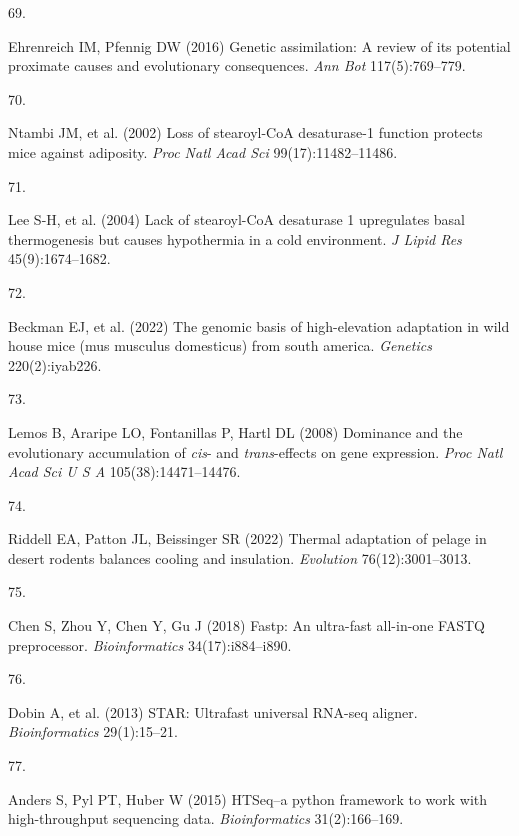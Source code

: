 \documentclass[9pt,twocolumn,twoside,lineno]{pnas-new}
\newlength{\cslhangindent}
\newlength{\csllabelwidth}
\newlength{\cslentryspacingunit} %
\newenvironment{CSLReferences}[2] %
 {%
  \setlength{\parindent}{0pt}
  \ifodd #1
  \let\oldpar\par
  \def\par{\hangindent=\cslhangindent\oldpar}
  \fi
  \setlength{\parskip}{#2\cslentryspacingunit}
 }%
 {}
\newcommand{\CSLLeftMargin}[1]{\parbox[t]{\csllabelwidth}{#1}}
\newcommand{\CSLRightInline}[1]{\parbox[t]{\linewidth - \csllabelwidth}{#1}\break}
\begin{document}
\begin{CSLReferences}{0}{0}
\leavevmode{}%
\CSLLeftMargin{69. }%
\CSLRightInline{Ehrenreich IM, Pfennig DW (2016) Genetic assimilation: A
review of its potential proximate causes and evolutionary consequences.
\emph{Ann Bot} 117(5):769--779.}

\leavevmode{}%
\CSLLeftMargin{70. }%
\CSLRightInline{Ntambi JM, et al. (2002) Loss of {stearoyl-CoA}
desaturase-1 function protects mice against adiposity. \emph{Proc Natl
Acad Sci} 99(17):11482--11486.}

\leavevmode{}%
\CSLLeftMargin{71. }%
\CSLRightInline{Lee S-H, et al. (2004) Lack of {stearoyl-CoA} desaturase
1 upregulates basal thermogenesis but causes hypothermia in a cold
environment. \emph{J Lipid Res} 45(9):1674--1682.}

\leavevmode{}%
\CSLLeftMargin{72. }%
\CSLRightInline{Beckman EJ, et al. (2022) The genomic basis of
high-elevation adaptation in wild house mice (mus musculus domesticus)
from south america. \emph{Genetics} 220(2):iyab226.}

\leavevmode{}%
\CSLLeftMargin{73. }%
\CSLRightInline{Lemos B, Araripe LO, Fontanillas P, Hartl DL (2008)
Dominance and the evolutionary accumulation of \emph{cis}- and
\emph{trans}-effects on gene expression. \emph{Proc Natl Acad Sci U S A}
105(38):14471--14476.}

\leavevmode{}%
\CSLLeftMargin{74. }%
\CSLRightInline{Riddell EA, Patton JL, Beissinger SR (2022) Thermal
adaptation of pelage in desert rodents balances cooling and insulation.
\emph{Evolution} 76(12):3001--3013.}

\leavevmode{}%
\CSLLeftMargin{75. }%
\CSLRightInline{Chen S, Zhou Y, Chen Y, Gu J (2018) Fastp: An ultra-fast
all-in-one {FASTQ} preprocessor. \emph{Bioinformatics}
34(17):i884--i890.}

\leavevmode{}%
\CSLLeftMargin{76. }%
\CSLRightInline{Dobin A, et al. (2013) {STAR}: Ultrafast universal
{RNA-seq} aligner. \emph{Bioinformatics} 29(1):15--21.}

\leavevmode{}%
\CSLLeftMargin{77. }%
\CSLRightInline{Anders S, Pyl PT, Huber W (2015) {HTSeq--a} python
framework to work with high-throughput sequencing data.
\emph{Bioinformatics} 31(2):166--169.}


\end{CSLReferences}
\end{document}
